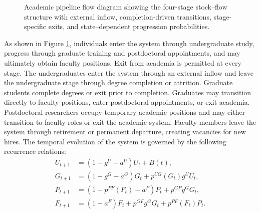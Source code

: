 \documentclass[3p]{elsarticle}%
\theoremstyle{definition}
\begin{document}
\begin{figure}[H]
{
\caption{Academic pipeline flow diagram showing the four-stage stock–flow structure with external inflow, completion-driven transitions, stage-specific exits, and state--dependent progression probabilities.}
\label{fig:pipeline_flow}}
\end{figure}
 \noindent As shown in Figure \ref{fig:pipeline_flow}, individuals enter the system through undergraduate study, progress through graduate training and postdoctoral appointments, and may ultimately obtain faculty positions. Exit from academia is permitted at every stage. The undergraduates enter the system through an external inflow and leave the undergraduate stage through degree completion or attrition. Graduate students complete degrees or exit prior to completion. Graduates may transition directly to faculty positions, enter postdoctoral appointments, or exit academia. Postdoctoral researchers occupy temporary academic positions and may either transition to faculty roles or exit the academic system. Faculty members leave the system through retirement or permanent departure, creating vacancies for new hires. The temporal evolution of the system is governed by the following recurrence relations:
\begin{equation}
\begin{aligned}
U_{t+1} &= (1 - g^U - a^U)U_t + B(t), \\
G_{t+1} &= (1 - g^G - a^G)G_t + p^{UG}(G_t) g^U U_t, \\
P_{t+1} &= \left(1 - p^{PF}(F_t) - a^P\right)P_t + p^{GP} g^G G_t, \\
F_{t+1} &= (1 - a^F)F_t + p^{GF} g^G G_t + p^{PF}(F_t)P_t. 
\end{aligned}\label{model}
\end{equation}
\end{document}
